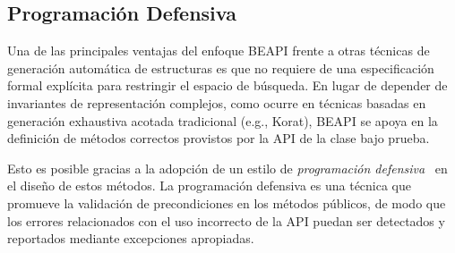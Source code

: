 
\subsection{Programación Defensiva}
\label{sec:defensiveProgramming}

Una de las principales ventajas del enfoque \textsf{BEAPI} frente a otras técnicas de generación automática de estructuras 
es que no requiere de una especificación formal explícita para restringir el espacio de búsqueda. 
En lugar de depender de invariantes de representación complejos, como ocurre en técnicas basadas en generación exhaustiva acotada tradicional 
(e.g., \textsf{Korat}), \textsf{BEAPI} se apoya en la definición de métodos correctos provistos por la API de la clase bajo prueba.

Esto es posible gracias a la adopción de un estilo de \emph{programación defensiva}~\cite{Liskov00} en el diseño de estos métodos. 
La programación defensiva es una técnica que promueve la validación de precondiciones en los métodos públicos, de modo que los errores 
relacionados con el uso incorrecto de la API puedan ser detectados y reportados mediante excepciones apropiadas.

